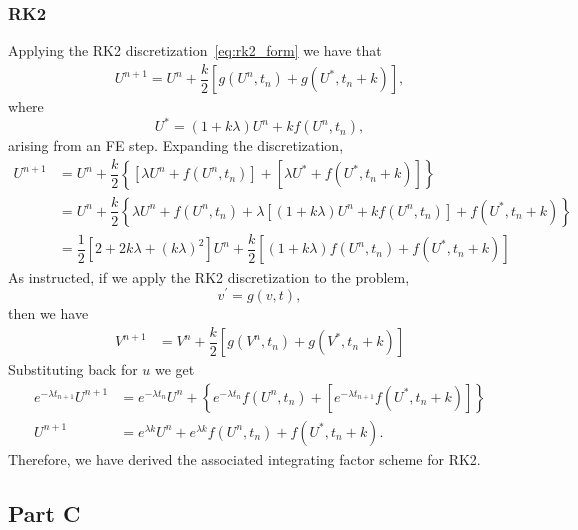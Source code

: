 \documentclass[12pt]{article}
\begin{document}
\subsubsection*{RK2}
Applying the RK2 discretization~\eqref{eq:rk2_form} we have that
\begin{align}
    U^{n+1} = U^{n} + \dfrac{k}{2}\left[g(U^{n},t_{n}) + g(U^{*},t_{n}+k)\right],
\end{align}
where \[U^{*} = (1+k\lambda)U^{n} + kf(U^{n},t_{n}),\] arising from an FE step. Expanding the discretization,
\begin{subequations}
    \begin{align}
        U^{n+1} &= U^{n} + \dfrac{k}{2}\left\{\left[\lambda U^{n} + f(U^{n},t_{n})\right] + \left[\lambda U^{*} + f(U^{*},t_{n}+k)\right]\right\}\\
        &= U^{n} + \dfrac{k}{2}\left\{\lambda U^{n} + f(U^{n},t_{n}) + \lambda \left[(1+k\lambda)U^{n} + kf(U^{n},t_{n})\right] + f(U^{*},t_{n}+k)\right\}\\
        &= \dfrac{1}{2}\left[2+2k\lambda+(k\lambda)^{2}\right]U^{n} + \dfrac{k}{2}\left[(1+k\lambda)f(U^{n},t_{n})+f(U^{*},t_{n}+k)\right]
    \end{align}
\end{subequations}
As instructed, if we apply the RK2 discretization to the problem, \[ v^{\prime} = g(v,t),\] then we have
\begin{align}
    V^{n+1} &= V^{n} + \dfrac{k}{2}\left[g(V^{n},t_{n}) + g(V^{*},t_{n}+k)\right]
\end{align}
Substituting back for $u$ we get
\begin{subequations}
    \begin{align}
    e^{-\lambda t_{n+1}}U^{n+1} &= e^{-\lambda t_{n}}U^{n} + \left\{e^{-\lambda t_{n}}f(U^{n},t_{n})+\left[e^{-\lambda t_{n+1}}f(U^{*},t_{n}+k)\right]\right\}\\
    U^{n+1} &= e^{\lambda k} U^{n} + e^{\lambda k} f(U^{n},t_{n}) + f(U^{*},t_{n}+k).
    \end{align}
\end{subequations}
Therefore, we have derived the associated integrating factor scheme for RK2.

\subsection*{Part C}
\end{document}
